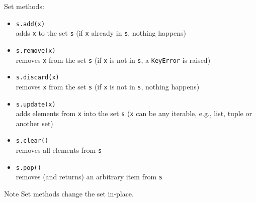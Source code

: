 \documentclass[t,handout,9pt]{beamer}
\begin{document}
%
\begin{frame}
	\vfill
Set methods:
\begin{itemize}
	\item \texttt{s.add(x)}\\
	\quad adds \texttt{x} to the set \texttt{s} (if \texttt{x} already in \texttt{s}, nothing happens)
	\item \texttt{s.remove(x)}\\
	\quad removes \texttt{x} from the set \texttt{s} (if \texttt{x} is not in \texttt{s}, a \texttt{KeyError} is raised)
	\item \texttt{s.discard(x)}\\
	\quad removes \texttt{x} from the set \texttt{s} (if \texttt{x} is not in \texttt{s}, nothing happens)
	\item \texttt{s.update(x)}\\
	\quad adds elements from \texttt{x} into the set \texttt{s} (\texttt{x} can be any iterable, e.g., list, tuple or another set)
	\item \texttt{s.clear()}\\
	\quad removes all elements from \texttt{s}
	\item \texttt{s.pop()}\\
	\quad removes (and returns) an arbitrary item from \texttt{s}
\end{itemize}
\vfill
\begin{block}{Note}
Set methods change the set in-place.
\end{block}
\vfill
\end{frame}
\end{document}
